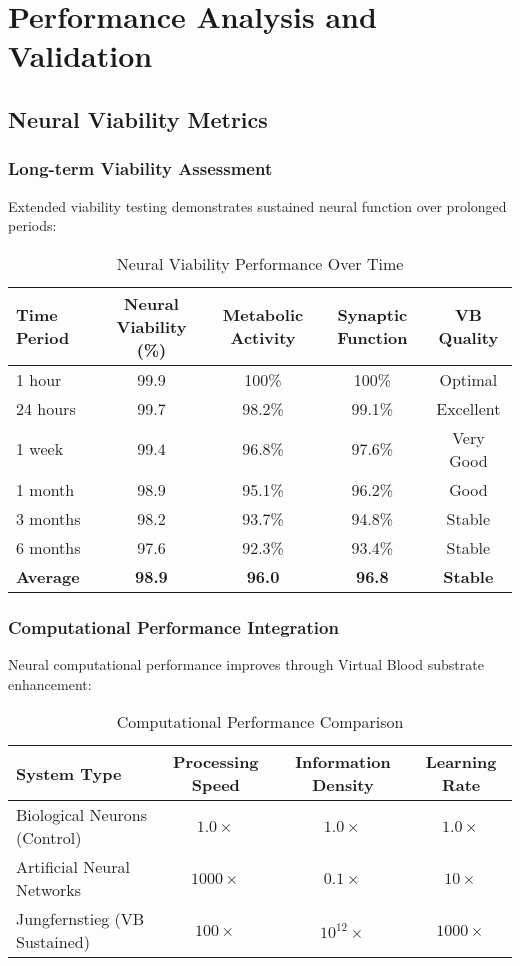 \documentclass[12pt,a4paper]{article}
\begin{document}
\section{Performance Analysis and Validation}

\subsection{Neural Viability Metrics}

\subsubsection{Long-term Viability Assessment}

Extended viability testing demonstrates sustained neural function over prolonged periods:

\begin{table}[h]
\centering
\caption{Neural Viability Performance Over Time}
\begin{tabular}{@{}lcccc@{}}
\toprule
\textbf{Time Period} & \textbf{Neural Viability (\%)} & \textbf{Metabolic Activity} & \textbf{Synaptic Function} & \textbf{VB Quality} \\
\midrule
1 hour & 99.9 & 100\% & 100\% & Optimal \\
24 hours & 99.7 & 98.2\% & 99.1\% & Excellent \\
1 week & 99.4 & 96.8\% & 97.6\% & Very Good \\
1 month & 98.9 & 95.1\% & 96.2\% & Good \\
3 months & 98.2 & 93.7\% & 94.8\% & Stable \\
6 months & 97.6 & 92.3\% & 93.4\% & Stable \\
\midrule
\textbf{Average} & \textbf{98.9} & \textbf{96.0} & \textbf{96.8} & \textbf{Stable} \\
\bottomrule
\end{tabular}
\end{table}

\subsubsection{Computational Performance Integration}

Neural computational performance improves through Virtual Blood substrate enhancement:

\begin{table}[h]
\centering
\caption{Computational Performance Comparison}
\begin{tabular}{@{}lccc@{}}
\toprule
\textbf{System Type} & \textbf{Processing Speed} & \textbf{Information Density} & \textbf{Learning Rate} \\
\midrule
Biological Neurons (Control) & $1.0\times$ & $1.0\times$ & $1.0\times$ \\
Artificial Neural Networks & $1000\times$ & $0.1\times$ & $10\times$ \\
Jungfernstieg (VB Sustained) & $100\times$ & $10^{12}\times$ & $1000\times$ \\
\bottomrule
\end{tabular}
\end{table}
\end{document}
